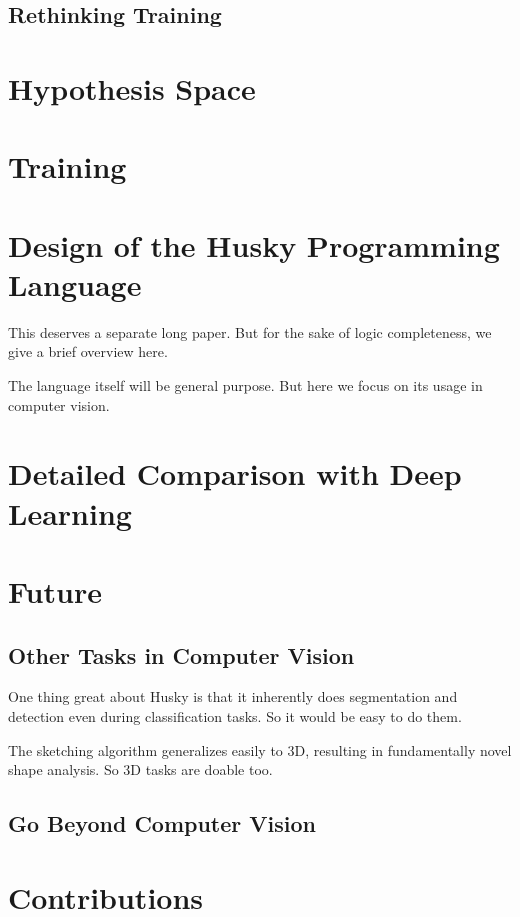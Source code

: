 \documentclass[11pt, oneside]{article}   	%
\theoremstyle{definition}
\begin{document}
\subsection{Rethinking Training}

\section{Hypothesis Space}

\section{Training}

\section{Design of the Husky Programming Language}

This deserves a separate long paper. But for the sake of logic completeness, we give a brief overview here.

The language itself will be general purpose. But here we focus on its usage in computer vision.

\section{Detailed Comparison with Deep Learning}

\section{Future}

\subsection{Other Tasks in Computer Vision}

One thing great about Husky is that it inherently does segmentation and detection even during classification tasks. So it would be easy to do them.

The sketching algorithm generalizes easily to 3D, resulting in fundamentally novel shape analysis. So 3D tasks are doable too.

\subsection{Go Beyond Computer Vision}


\section{Contributions}
\end{document}
